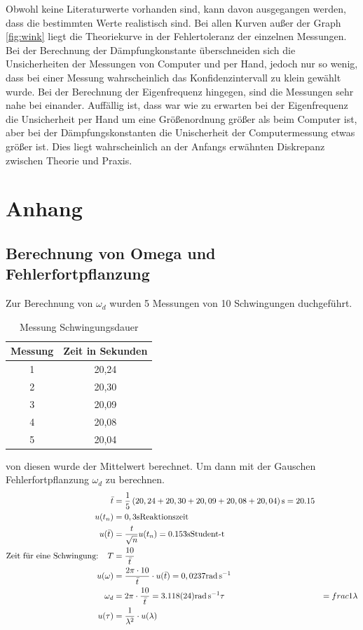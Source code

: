 \documentclass[11pt, a4paper]{article}
\begin{document}
    Obwohl keine Literaturwerte vorhanden sind, kann davon ausgegangen werden, dass die bestimmten Werte realistisch sind.
    Bei allen Kurven außer der Graph \ref{fig:wink} liegt die Theoriekurve in der Fehlertoleranz der einzelnen Messungen.
    Bei der Berechnung der Dämpfungkonstante überschneiden sich die Unsicherheiten der Messungen von Computer und per Hand,
    jedoch nur so  wenig, dass bei einer Messung wahrscheinlich das Konfidenzintervall zu klein gewählt wurde. Bei der
    Berechnung der Eigenfrequenz hingegen, sind die Messungen sehr nahe bei einander. Auffällig ist, dass war wie zu
    erwarten bei der Eigenfrequenz die Unsicherheit per Hand um eine Größenordnung größer als beim Computer ist,
    aber bei der Dämpfungskonstanten die Unischerheit der Computermessung etwas größer ist. Dies liegt wahrscheinlich an der Anfangs
    erwähnten Diskrepanz zwischen Theorie und Praxis.

    \section{Anhang}

    \subsection{Berechnung von Omega und Fehlerfortpflanzung} \label{sec:omega}
    Zur Berechnung von $\omega_d$ wurden 5 Messungen von 10 Schwingungen duchgeführt.
    \begin{table}
        \centering
        \begin{tabular}{c c}
            Messung & Zeit in Sekunden \\ \hline
            1 & 20,24 \\
            2 & 20,30 \\
            3 & 20,09 \\
            4 & 20,08 \\
            5 & 20,04
        \end{tabular}
        \caption{Messung Schwingungsdauer}
        \label{Tab:messen}
    \end{table}
    von diesen wurde der Mittelwert berechnet. Um dann mit der Gauschen Fehlerfortpflanzung \cite[(19)]{ABW} $\omega_d$ zu berechnen.
    \begin{align}
        \bar{t} &= \frac{1}{5} \left(20,24 + 20,30 + 20,09 + 20,08 + 20,04 \right) \si{\second} = 20.15 \\
        u(t_n) &= 0,3 \si{\second} \text{Reaktionszeit} \\
        u(\bar{t}) &= \frac{{\it t}}{\sqrt{n}} u(t_n) = 0.153 \si{\second} \text{Student-t} \\
        \text{Zeit für eine Schwingung: } \ \ T &= \frac{10}{\bar{t}} \\
        u(\omega) &= \frac{2 \pi \cdot 10}{\bar{t}} \cdot u(\bar{t}) = 0,0237 \si{\radian\per\second} \\
        \omega_d &= 2 \pi \cdot \frac{10}{\bar{t}} = 3.118(24) \si{\radian\per\second}
        \tau &= frac{1}{\lambda} \\
        u(\tau) &= \frac{1}{\lambda^2} \cdot u(\lambda)
    \end{align}


    
    
\end{document}

